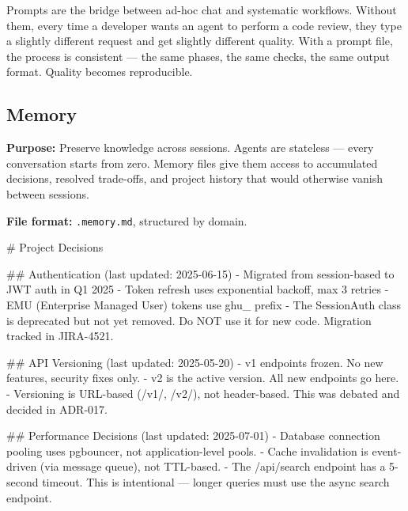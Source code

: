 \documentclass[
  a4paper,
  DIV=11,
  numbers=noendperiod]{scrreprt}
\newenvironment{Shaded}{\begin{snugshade}}{\end{snugshade}}
\newcommand{\FunctionTok}[1]{\textcolor[rgb]{0.28,0.35,0.67}{#1}}
\newcommand{\InformationTok}[1]{\textcolor[rgb]{0.37,0.37,0.37}{#1}}
\newcommand{\NormalTok}[1]{\textcolor[rgb]{0.00,0.23,0.31}{#1}}
\newcommand{\SpecialStringTok}[1]{\textcolor[rgb]{0.13,0.47,0.30}{#1}}
\begin{document}
Prompts are the bridge between ad-hoc chat and systematic workflows.
Without them, every time a developer wants an agent to perform a code
review, they type a slightly different request and get slightly
different quality. With a prompt file, the process is consistent --- the
same phases, the same checks, the same output format. Quality becomes
reproducible.

\subsection{Memory}\label{memory}

\textbf{Purpose:} Preserve knowledge across sessions. Agents are
stateless --- every conversation starts from zero. Memory files give
them access to accumulated decisions, resolved trade-offs, and project
history that would otherwise vanish between sessions.

\textbf{File format:} \texttt{.memory.md}, structured by domain.

\begin{Shaded}
\begin{Highlighting}[]
\FunctionTok{\# Project Decisions}

\FunctionTok{\#\# Authentication (last updated: 2025{-}06{-}15)}
\SpecialStringTok{{-} }\NormalTok{Migrated from session{-}based to JWT auth in Q1 2025}
\SpecialStringTok{{-} }\NormalTok{Token refresh uses exponential backoff, max 3 retries}
\SpecialStringTok{{-} }\NormalTok{EMU (Enterprise Managed User) tokens use }\InformationTok{\textasciigrave{}ghu\_\textasciigrave{}}\NormalTok{ prefix}
\SpecialStringTok{{-} }\NormalTok{The }\InformationTok{\textasciigrave{}SessionAuth\textasciigrave{}}\NormalTok{ class is deprecated but not yet removed.}
\NormalTok{  Do NOT use it for new code. Migration tracked in JIRA{-}4521.}

\FunctionTok{\#\# API Versioning (last updated: 2025{-}05{-}20)}
\SpecialStringTok{{-} }\NormalTok{v1 endpoints frozen. No new features, security fixes only.}
\SpecialStringTok{{-} }\NormalTok{v2 is the active version. All new endpoints go here.}
\SpecialStringTok{{-} }\NormalTok{Versioning is URL{-}based (/v1/, /v2/), not header{-}based.}
\NormalTok{  This was debated and decided in ADR{-}017.}

\FunctionTok{\#\# Performance Decisions (last updated: 2025{-}07{-}01)}
\SpecialStringTok{{-} }\NormalTok{Database connection pooling uses pgbouncer, not application{-}level pools.}
\SpecialStringTok{{-} }\NormalTok{Cache invalidation is event{-}driven (via message queue), not TTL{-}based.}
\SpecialStringTok{{-} }\NormalTok{The /api/search endpoint has a 5{-}second timeout. This is intentional —}
\NormalTok{  longer queries must use the async search endpoint.}
\end{Highlighting}
\end{Shaded}
\end{document}
